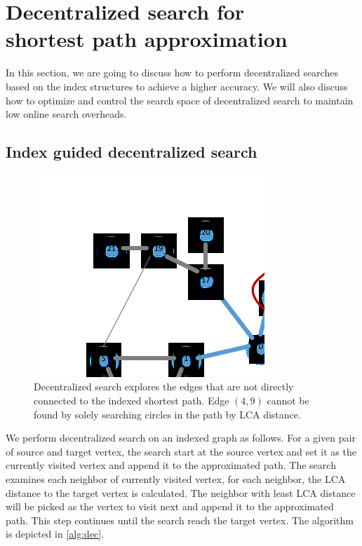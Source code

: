 \section{Decentralized search for \\ shortest path approximation}
\label{searching}

In this section, we are going to discuss how to perform decentralized searches based on the index structures to achieve a higher accuracy. We will also discuss how to optimize and control the search space of decentralized search to maintain low online search overheads.

\subsection{Index guided decentralized search}

\begin{figure}[t]
    \centering
    \includegraphics[width=\linewidth]{./figures/new_illustrate/dec_common.pdf}
    \caption{Decentralized search explores the edges that are not directly connected to the indexed shortest path. Edge $(4, 9)$ cannot be found by solely searching circles in the path by LCA distance.}
    \label{fig:dec_common}
\end{figure}

We perform decentralized search on an indexed graph as follows. For a given pair of source and target vertex, the search start at the source vertex and set it as the currently visited vertex and append it to the approximated path. The search examines each neighbor of currently visited vertex, for each neighbor, the LCA distance to the target vertex is calculated. The neighbor with least LCA distance will be picked as the vertex to visit next and append it to the approximated path. This step continues until the search reach the target vertex. The algorithm is depicted in \ref{alg:dec}.

